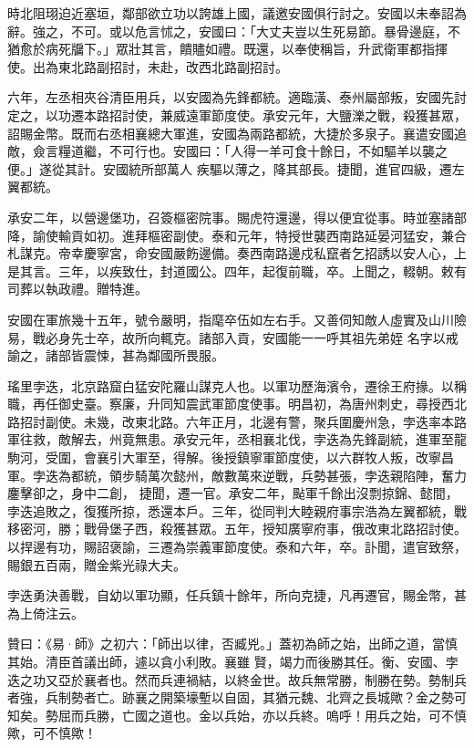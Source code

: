 \begin{pinyinscope}
 時北阻珝迫近塞垣，鄰部欲立功以誇雄上國，議邀安國俱行討之。安國以未奉詔為
 辭。強之，不可。或以危言怵之，安國曰：「大丈夫豈以生死易節。暴骨邊庭，不猶愈於病死牖下。」眾壯其言，饋贐如禮。既還，以奉使稱旨，升武衛軍都指揮使。出為東北路副招討，未赴，改西北路副招討。



 六年，左丞相夾谷清臣用兵，以安國為先鋒都統。適臨潢、泰州屬部叛，安國先討定之，以功遷本路招討使，兼威遠軍節度使。承安元年，大鹽濼之戰，殺獲甚眾，詔賜金幣。既而右丞相襄總大軍進，安國為兩路都統，大捷於多泉子。襄遣安國追敵，僉言糧道繼，不可行也。安國曰：「人得一羊可食十餘日，不如驅羊以襲之便。」遂從其計。安國統所部萬人
 疾驅以薄之，降其部長。捷聞，進官四級，遷左翼都統。



 承安二年，以營邊堡功，召簽樞密院事。賜虎符還邊，得以便宜從事。時並塞諸部降，諭使輸貢如初。進拜樞密副使。泰和元年，特授世襲西南路延晏河猛安，兼合札謀克。帝幸慶寧宮，命安國嚴飭邊備。奏西南路邊戍私竄者乞招誘以安人心，上是其言。三年，以疾致仕，封道國公。四年，起復前職，卒。上聞之，輟朝。敕有司葬以執政禮。贈特進。



 安國在軍旅幾十五年，號令嚴明，指麾卒伍如左右手。又善伺知敵人虛實及山川險易，戰必身先士卒，故所向輒克。諸部入貢，安國能一一呼其祖先弟姪
 名字以戒諭之，諸部皆震悚，甚為鄰國所畏服。



 瑤里孛迭，北京路窟白猛安陀羅山謀克人也。以軍功歷海濱令，遷徐王府掾。以稱職，再任御史臺。察廉，升同知震武軍節度使事。明昌初，為唐州刺史，尋授西北路招討副使。未幾，改東北路。六年正月，北邊有警，聚兵圍慶州急，孛迭率本路軍往救，敵解去，州竟無患。承安元年，丞相襄北伐，孛迭為先鋒副統，進軍至龍駒河，受圍，會襄引大軍至，得解。後授鎮寧軍節度使，以六群牧人叛，改寧昌軍。孛迭為都統，領步騎萬次懿州，敵數萬來逆戰，兵勢甚張，孛迭親陷陣，奮力鏖擊卻之，身中二創，
 捷聞，遷一官。承安二年，颭軍千餘出沒剽掠錦、懿間，孛迭追敗之，復獲所掠，悉還本戶。三年，從同判大睦親府事宗浩為左翼都統，戰移密河，勝；戰骨堡子西，殺獲甚眾。五年，授知廣寧府事，俄改東北路招討使。以捍邊有功，賜詔褒諭，三遷為崇義軍節度使。泰和六年，卒。訃聞，遣官致祭，賜銀五百兩，贈金紫光祿大夫。



 孛迭勇決善戰，自幼以軍功顯，任兵鎮十餘年，所向克捷，凡再遷官，賜金幣，甚為上倚注云。



 贊曰：《易·師》之初六：「師出以律，否臧兇。」蓋初為師之始，出師之道，當慎其始。清臣首議出師，遽以貪小利敗。襄雖
 賢，竭力而後勝其任。衡、安國、孛迭之功又亞於襄者也。然而兵連禍結，以終金世。故兵無常勝，制勝在勢。勢制兵者強，兵制勢者亡。跡襄之開築壕塹以自固，其猶元魏、北齊之長城歟？金之勢可知矣。勢屈而兵勝，亡國之道也。金以兵始，亦以兵終。嗚呼！用兵之始，可不慎歟，可不慎歟！



\end{pinyinscope}